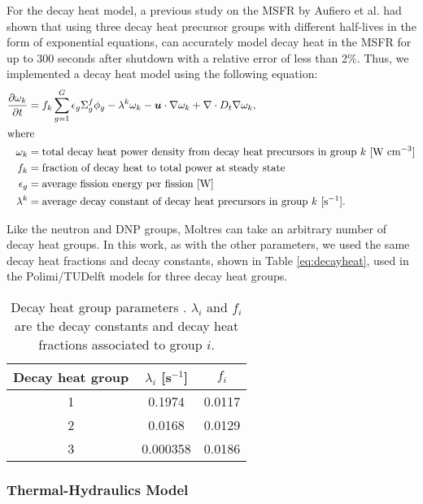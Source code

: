 For the decay heat model, a previous study on the MSFR by Aufiero et al.
\cite{aufiero_extended_2013} had shown that using three decay heat precursor
groups with different half-lives in the form of exponential equations, can
accurately model decay heat in the MSFR for up to 300 seconds after shutdown
with a relative error of less than 2\%. Thus, we implemented a decay heat
model using the following equation:
%
\begin{align}
	\frac{\partial \omega_k}{\partial t} &= f_k \sum^G_{g=1} \epsilon_{g}
	\Sigma^f_{g} \phi_{g} - \lambda^k \omega_k - \boldsymbol{u} \cdot \nabla
	\omega_k + \nabla \cdot D_t \nabla \omega_k, \label{eq:decayheat} \\
	\intertext{where}
    \omega_k &= \text{total decay heat power density from decay heat
    precursors in group $k$ [W cm$^{-3}$]} \nonumber \\
	f_k &= \text{fraction of decay heat to total power at steady state}
	\nonumber \\
	\epsilon_g &= \text{average fission energy per fission [W]} \nonumber \\
	\lambda^k &= \text{average decay constant of decay heat precursors in
	group $k$ [s$^{-1}$].} \nonumber
\end{align}

Like the neutron and \gls{DNP} groups, Moltres can take an arbitrary number of
decay heat groups. In this work, as with the other parameters, we used the
same decay heat fractions and decay constants, shown in Table
\ref{eq:decayheat}, used in the Polimi/TUDelft models for three decay heat
groups.

\begin{table}[htb!]
	\centering
	\caption{Decay heat group parameters \cite{fiorina_modelling_2014}.
	$\lambda_i$ and $f_i$ are the decay constants and decay heat fractions
	associated to group $i$.}
	\begin{tabular}{S S S}
		\toprule
		{Decay heat group} & {$\lambda_i$ [s$^{-1}$]} & {$f_i$} \\
		 & 0.1974 & 0.0117 \\
		2 & 0.0168 & 0.0129 \\
		3 & 0.000358 & 0.0186 \\
		\bottomrule
	\end{tabular}
	\label{table:decayheat}
\end{table}

\subsubsection{Thermal-Hydraulics Model}

